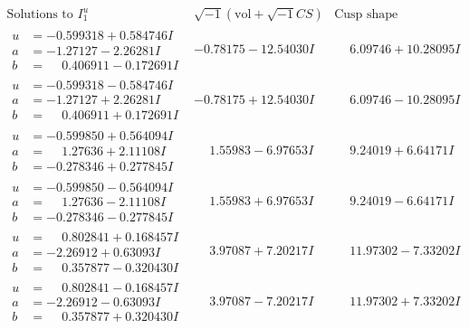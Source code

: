 \documentclass[1p]{elsarticle_modified}
\theoremstyle{definition}
\newcommand{\I}{\sqrt{-1}}
\begin{document}
$$\begin{array}{c|c|c}  
\text{Solutions to }I^u_{1}& \I (\text{vol} + \sqrt{-1}CS) & \text{Cusp shape}\\
 \hline 
\begin{aligned}
u &= -0.599318 + 0.584746 I \\
a &= -1.27127 - 2.26281 I \\
b &= \phantom{-}0.406911 - 0.172691 I\end{aligned}
 & -0.78175 - 12.54030 I & \phantom{-}6.09746 + 10.28095 I \\ \hline\begin{aligned}
u &= -0.599318 - 0.584746 I \\
a &= -1.27127 + 2.26281 I \\
b &= \phantom{-}0.406911 + 0.172691 I\end{aligned}
 & -0.78175 + 12.54030 I & \phantom{-}6.09746 - 10.28095 I \\ \hline\begin{aligned}
u &= -0.599850 + 0.564094 I \\
a &= \phantom{-}1.27636 + 2.11108 I \\
b &= -0.278346 + 0.277845 I\end{aligned}
 & \phantom{-}1.55983 - 6.97653 I & \phantom{-}9.24019 + 6.64171 I \\ \hline\begin{aligned}
u &= -0.599850 - 0.564094 I \\
a &= \phantom{-}1.27636 - 2.11108 I \\
b &= -0.278346 - 0.277845 I\end{aligned}
 & \phantom{-}1.55983 + 6.97653 I & \phantom{-}9.24019 - 6.64171 I \\ \hline\begin{aligned}
u &= \phantom{-}0.802841 + 0.168457 I \\
a &= -2.26912 + 0.63093 I \\
b &= \phantom{-}0.357877 - 0.320430 I\end{aligned}
 & \phantom{-}3.97087 + 7.20217 I & \phantom{-}11.97302 - 7.33202 I \\ \hline\begin{aligned}
u &= \phantom{-}0.802841 - 0.168457 I \\
a &= -2.26912 - 0.63093 I \\
b &= \phantom{-}0.357877 + 0.320430 I\end{aligned}
 & \phantom{-}3.97087 - 7.20217 I & \phantom{-}11.97302 + 7.33202 I \\ \hline\begin{aligned}

\end{aligned}
\end{array}$$
\end{document}
